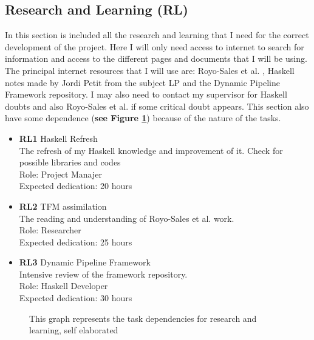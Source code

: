 \subsection{Research and Learning \textbf{(RL)}}
In this section is included all the research and learning that I need for the correct development of the project.
Here I will only need access to internet to search for information and access to the different pages and documents that I will be using.
The principal internet resources that I will use are: Royo-Sales et al. \cite{royo_sales_algorithm_2021}, Haskell notes made by Jordi Petit from the subject LP and the Dynamic Pipeline Framework repository.
I may also need to contact my supervisor for Haskell doubts and also Royo-Sales et al. \cite{royo_sales_algorithm_2021} if some critical doubt appears.
This section also have some dependence (\textbf{see Figure \ref{RL_dependences}}) because of the nature of the tasks.
\begin{itemize}
    \item \textbf{RL1} Haskell Refresh \\
        The refresh of my Haskell knowledge and improvement of it. 
        Check for possible libraries and codes \\
        Role: Project Manajer \\
        Expected dedication: 20 hours
    \item \textbf{RL2} TFM assimilation\\
        The reading and understanding of Royo-Sales et al. \cite{royo_sales_algorithm_2021} work. \\
        Role: Researcher \\
        Expected dedication: 25 hours
    \item \textbf{RL3} Dynamic Pipeline Framework \\
        Intensive review of the framework repository. \\
        Role: Haskell Developer \\
        Expected dedication: 30 hours 
\end{itemize}
\begin{figure}[h]
    \centering
    \caption[{[Pla] TD for reserch and learning}]{This graph represents the task dependencies for research and learning, self elaborated}
    \label{RL_dependences}
\end{figure}

